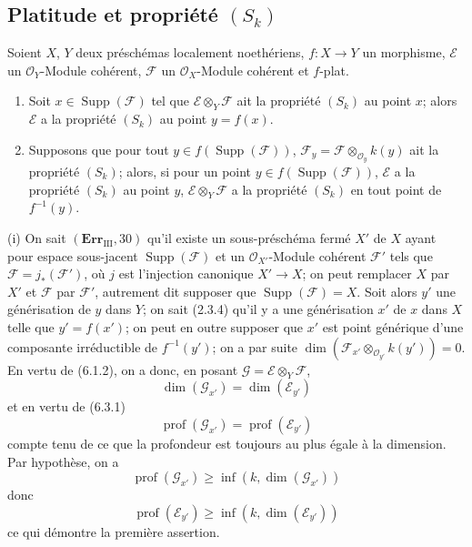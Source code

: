 \subsection{Platitude et propriété $(S_k)$}

\begin{proposition}[6.4.1]
\label{IV.2.s6.4.1-fr}
Soient $X$, $Y$ deux préschémas localement noethériens, $f:X\to Y$ un
morphisme, $\mathscr E$ un $\mathcal O_Y$-Module cohérent,
$\mathscr F$ un $\mathcal O_X$-Module cohérent et $f$-plat.
\begin{enumerate}
\item[(i)] Soit $x\in\operatorname{Supp}(\mathscr F)$ tel que
$\mathscr E\otimes_Y\mathscr F$ ait la propriété $(S_k)$ au point $x$; alors
$\mathscr E$ a la propriété $(S_k)$ au point $y=f(x)$.
\item[(ii)] Supposons que pour tout
$y\in f(\operatorname{Supp}(\mathscr F))$,
$\mathscr F_y=\mathscr F\otimes_{\mathcal O_y}k(y)$ ait la propriété
$(S_k)$; alors, si pour un point
$y\in f(\operatorname{Supp}(\mathscr F))$, $\mathscr E$ a la propriété
$(S_k)$ au point $y$, $\mathscr E\otimes_Y\mathscr F$ a la propriété
$(S_k)$ en tout point de $f^{-1}(y)$.
\end{enumerate}
\end{proposition}

(i) On sait $(\mathbf{Err}_{\mathrm{III}},30)$ qu'il existe un sous-préschéma
fermé $X'$ de $X$ ayant pour espace sous-jacent
$\operatorname{Supp}(\mathscr F)$ et un $\mathcal O_{X'}$-Module cohérent
$\mathscr F'$ tels que $\mathscr F=j_*(\mathscr F')$, où $j$ est l'injection
canonique $X'\to X$; on peut remplacer $X$ par $X'$ et $\mathscr F$ par
$\mathscr F'$, autrement dit supposer que
$\operatorname{Supp}(\mathscr F)=X$. Soit alors $y'$ une générisation de $y$
dans $Y$; on sait (2.3.4) qu'il y a une générisation $x'$ de $x$ dans $X$
telle que $y'=f(x')$; on peut en outre supposer que $x'$ est point générique
d'une composante irréductible de $f^{-1}(y')$; on a par suite
$\dim(\mathscr F_{x'}\otimes_{\mathcal O_{y'}}k(y'))=0$. En vertu de (6.1.2),
on a donc, en posant $\mathscr G=\mathscr E\otimes_Y\mathscr F$,
\[
\dim(\mathscr G_{x'})=\dim(\mathscr E_{y'})
\]
et en vertu de (6.3.1)
\[
\operatorname{prof}(\mathscr G_{x'})=\operatorname{prof}(\mathscr E_{y'})
\]
compte tenu de ce que la profondeur est toujours au plus égale à la
dimension. Par hypothèse, on a
\[
\operatorname{prof}(\mathscr G_{x'})
\geq\inf(k,\dim(\mathscr G_{x'}))
\]
donc
\[
\operatorname{prof}(\mathscr E_{y'})
\geq\inf(k,\dim(\mathscr E_{y'}))
\]
ce qui démontre la première assertion.

